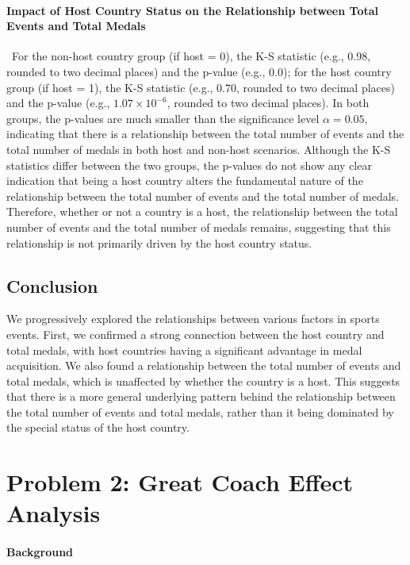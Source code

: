 \documentclass[12pt]{article}
\begin{document}
\paragraph{Impact of Host Country Status on the Relationship between Total Events and Total Medals} \
For the non-host country group (if host = 0), the K-S statistic (e.g., 0.98, rounded to two decimal places) and the p-value (e.g., 0.0); for the host country group (if host = 1), the K-S statistic (e.g., 0.70, rounded to two decimal places) and the p-value (e.g., $1.07 \times 10^{-6}$, rounded to two decimal places). In both groups, the p-values are much smaller than the significance level $\alpha=0.05$, indicating that there is a relationship between the total number of events and the total number of medals in both host and non-host scenarios. Although the K-S statistics differ between the two groups, the p-values do not show any clear indication that being a host country alters the fundamental nature of the relationship between the total number of events and the total number of medals. Therefore, whether or not a country is a host, the relationship between the total number of events and the total number of medals remains, suggesting that this relationship is not primarily driven by the host country status.

\subsection{Conclusion}
We progressively explored the relationships between various factors in sports events. First, we confirmed a strong connection between the host country and total medals, with host countries having a significant advantage in medal acquisition. We also found a relationship between the total number of events and total medals, which is unaffected by whether the country is a host. This suggests that there is a more general underlying pattern behind the relationship between the total number of events and total medals, rather than it being dominated by the special status of the host country.

\section{Problem 2: Great Coach Effect Analysis}

\paragraph{Background} \
\end{document}
